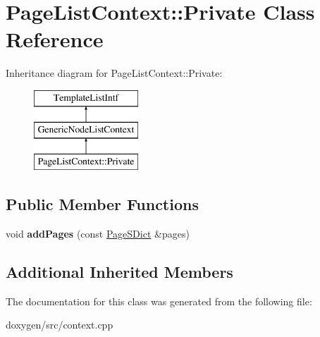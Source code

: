 \hypertarget{class_page_list_context_1_1_private}{}\section{Page\+List\+Context\+::Private Class Reference}
\label{class_page_list_context_1_1_private}
Inheritance diagram for Page\+List\+Context\+::Private\+:\begin{figure}[H]
\begin{center}
\leavevmode
\includegraphics[height=3.000000cm]{class_page_list_context_1_1_private}
\end{center}
\end{figure}
\subsection*{Public Member Functions}
\begin{DoxyCompactItemize}
\item 
\mbox{\label{class_page_list_context_1_1_private_a3492e07847570089df5fb62692cd7edf}} 
void {\bfseries add\+Pages} (const \mbox{\hyperlink{class_page_s_dict}{Page\+S\+Dict}} \&pages)
\end{DoxyCompactItemize}
\subsection*{Additional Inherited Members}


The documentation for this class was generated from the following file\+:\begin{DoxyCompactItemize}
\item 
doxygen/src/context.\+cpp\end{DoxyCompactItemize}
